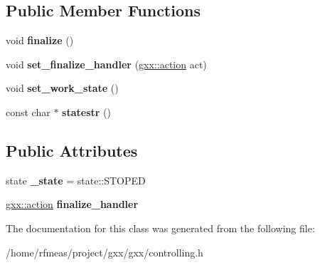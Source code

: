 \subsection*{Public Member Functions}
\begin{DoxyCompactItemize}
\item 
void {\bfseries finalize} ()\hypertarget{classgxx_1_1controller_ae34771ff9211cc037081c47df5ff53ce}{}\label{classgxx_1_1controller_ae34771ff9211cc037081c47df5ff53ce}

\item 
void {\bfseries set\+\_\+finalize\+\_\+handler} (\hyperlink{classgxx_1_1delegate}{gxx\+::action} act)\hypertarget{classgxx_1_1controller_aa078f0e51f2a6ea029c914a84bdbbac8}{}\label{classgxx_1_1controller_aa078f0e51f2a6ea029c914a84bdbbac8}

\item 
void {\bfseries set\+\_\+work\+\_\+state} ()\hypertarget{classgxx_1_1controller_a06d38fbd0f11938c16c94299db8201e1}{}\label{classgxx_1_1controller_a06d38fbd0f11938c16c94299db8201e1}

\item 
const char $\ast$ {\bfseries statestr} ()\hypertarget{classgxx_1_1controller_aadf433685594ab166f94a6cef80845f2}{}\label{classgxx_1_1controller_aadf433685594ab166f94a6cef80845f2}

\end{DoxyCompactItemize}
\subsection*{Public Attributes}
\begin{DoxyCompactItemize}
\item 
state {\bfseries \+\_\+state} = state\+::\+S\+T\+O\+P\+ED\hypertarget{classgxx_1_1controller_a42a5dab49c033e9998e8acd90d801bf4}{}\label{classgxx_1_1controller_a42a5dab49c033e9998e8acd90d801bf4}

\item 
\hyperlink{classgxx_1_1delegate}{gxx\+::action} {\bfseries finalize\+\_\+handler}\hypertarget{classgxx_1_1controller_a365dc6aee9ece7677c40ed77d2053da1}{}\label{classgxx_1_1controller_a365dc6aee9ece7677c40ed77d2053da1}

\end{DoxyCompactItemize}


The documentation for this class was generated from the following file\+:\begin{DoxyCompactItemize}
\item 
/home/rfmeas/project/gxx/gxx/controlling.\+h\end{DoxyCompactItemize}
